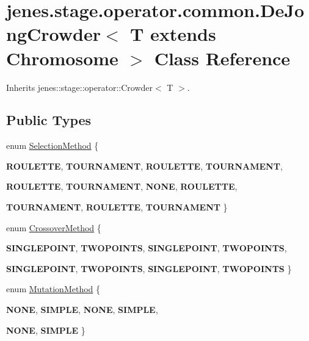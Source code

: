 \hypertarget{classjenes_1_1stage_1_1operator_1_1common_1_1_de_jong_crowder_3_01_t_01extends_01_chromosome_01_4}{
\section{jenes.stage.operator.common.DeJongCrowder$<$ T extends Chromosome $>$ Class Reference}
\label{classjenes_1_1stage_1_1operator_1_1common_1_1_de_jong_crowder_3_01_t_01extends_01_chromosome_01_4}
}
Inherits jenes::stage::operator::Crowder$<$ T $>$.

\subsection*{Public Types}
\begin{CompactItemize}
\item 
enum \hyperlink{classjenes_1_1stage_1_1operator_1_1common_1_1_de_jong_crowder_3_01_t_01extends_01_chromosome_01_4_4c04a136973e222068a9b2bad6593645}{SelectionMethod} \{ \par
\textbf{ROULETTE}, 
\textbf{TOURNAMENT}, 
\textbf{ROULETTE}, 
\textbf{TOURNAMENT}, 
\par
\textbf{ROULETTE}, 
\textbf{TOURNAMENT}, 
\textbf{NONE}, 
\textbf{ROULETTE}, 
\par
\textbf{TOURNAMENT}, 
\textbf{ROULETTE}, 
\textbf{TOURNAMENT}
 \}
\item 
enum \hyperlink{classjenes_1_1stage_1_1operator_1_1common_1_1_de_jong_crowder_3_01_t_01extends_01_chromosome_01_4_cd306135cc2dd505a1a981b36f4696ea}{CrossoverMethod} \{ \par
\textbf{SINGLEPOINT}, 
\textbf{TWOPOINTS}, 
\textbf{SINGLEPOINT}, 
\textbf{TWOPOINTS}, 
\par
\textbf{SINGLEPOINT}, 
\textbf{TWOPOINTS}, 
\textbf{SINGLEPOINT}, 
\textbf{TWOPOINTS}
 \}
\item 
enum \hyperlink{classjenes_1_1stage_1_1operator_1_1common_1_1_de_jong_crowder_3_01_t_01extends_01_chromosome_01_4_8f83051fb5a66142aaec4b66fddfff5c}{MutationMethod} \{ \par
\textbf{NONE}, 
\textbf{SIMPLE}, 
\textbf{NONE}, 
\textbf{SIMPLE}, 
\par
\textbf{NONE}, 
\textbf{SIMPLE}
 \}
\end{CompactItemize}

